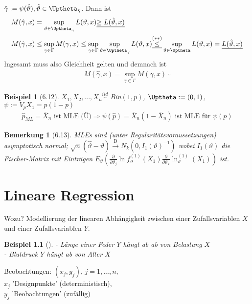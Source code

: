 \documentclass[a4paper,openany]{book}
\theoremstyle{mytheoremstyle}
\newtheorem*{bei}{Beispiel}
\newtheorem*{bem}{Bemerkung}
\theoremstyle{mytheoremstyle2}
\newtheorem*{cbew}{Beweis}
\newenvironment{bew}[1][]{%
  \ifthenelse{\boolean{showbew}}{%
    \begin{cbew}[#1]%
  }{%
    \expandafter\comment%
  }%
}{%
  \ifthenelse{\boolean{showbew}}{%
    \end{cbew}%
  }{%
    \expandafter\endcomment%
  }%
}
\begin{document}
\begin{bew}[]
  $\hat{\gamma }:=\psi (\hat{\vartheta }),\hat{\vartheta }\in \Uptheta _{\hat{\gamma }}$. Dann ist 
  \begin{align*}
    &M(\hat{\gamma },x)=\sup _{\vartheta \in \Uptheta _{\hat{\gamma }}}L(\vartheta ,x)\underline{\geq L(\hat{\vartheta} ,x)}\\
    &M(\hat{\gamma },x)\leq \sup _{\gamma \in \Gamma }M(\gamma ,x)\leq \sup _{\gamma \in \Gamma }\sup _{\vartheta \in \Uptheta _{\gamma }}L(\vartheta ,x)\underline{\overset{(**)}\leq} \sup _{\vartheta \in \Uptheta}L(\vartheta ,x)=\underline{L(\hat{\vartheta },x)}
  \end{align*}
  Ingesamt muss also Gleichheit gelten und demnach ist
  \begin{align*}
    M(\hat{\gamma },x)=\sup _{\gamma \in \Gamma }M(\gamma ,x)\;\square
  \end{align*}
\end{bew}
\begin{bei}[6.12]
  $X_1,X_2,...,X_n \overset{iid}\sim$ Bin$(1,p)$, $\Uptheta:=(0,1)$, $\psi :=V _{p}X_1=p(1-p)$    
  \begin{align*}
    \hat{p}_{ML}=\bar{X}_n \text{ ist MLE (Ü)} \Rightarrow \psi (\hat{p})=\bar{X}_n(1-\bar{X}_n)\text{ ist MLE für }\psi (p)
  \end{align*}
\end{bei}
\begin{bem}[6.13]
  MLEs sind (unter Regularitätsvoraussetzungen) asymptotisch normal; $\sqrt{n}(\hat{\vartheta }-\vartheta )\overset{\text{D}}\to N_k(0,I_1(\vartheta )^{-1})$ wobei $I_1(\vartheta )$ die Fischer-Matrix mit Einträgen $E _{\vartheta }(\frac{\partial }{\partial \vartheta _j}\ln f_{\vartheta }^{(1)}(X_1)\frac{\partial }{\partial \vartheta _k}\ln _{\vartheta }^{(1)}(X_1))$ ist.  
\end{bem}
\chapter{Lineare Regression}
Wozu? Modellierung der linearen Abhängigkeit zwischen einer Zufallsvariablen $X$ und einer Zufallsvariablen $Y$.
\begin{bei}[]
  - Länge einer Feder $Y$ hängt ab ab von Belastung $X$\\
  - Blutdruck $Y$ hängt ab von Alter $X$ 
\end{bei}
\noindent Beobachtungen: $(x_j,y_j)$, $j=1,...,n$, \\
$x_j$ 'Designpunkte' (deterministisch), \\
$y_j$ 'Beobachtungen' (zufällig)
\end{document}
